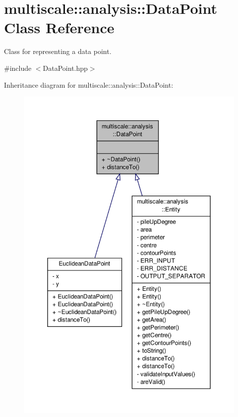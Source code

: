 \hypertarget{classmultiscale_1_1analysis_1_1DataPoint}{\section{multiscale\-:\-:analysis\-:\-:Data\-Point Class Reference}
\label{classmultiscale_1_1analysis_1_1DataPoint}
}


Class for representing a data point.  




{\ttfamily \#include $<$Data\-Point.\-hpp$>$}



Inheritance diagram for multiscale\-:\-:analysis\-:\-:Data\-Point\-:
\nopagebreak
\begin{figure}[H]
\begin{center}
\leavevmode
\includegraphics[width=350pt]{classmultiscale_1_1analysis_1_1DataPoint__inherit__graph}
\end{center}
\end{figure}


